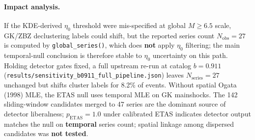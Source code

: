 \documentclass[draft]{agujournal2019}
\begin{document}
\paragraph{Impact analysis.}
If the KDE-derived $\eta_0$ threshold were mis-specified at global $M \ge 6.5$
scale, GK/ZBZ declustering labels could shift, but the reported series count
$N_\mathrm{obs}=27$ is computed by \texttt{global\_series()}, which does
\textbf{not} apply $\eta_0$ filtering; the main temporal-null conclusion is therefore
stable to $\eta_0$ uncertainty on this path.
Holding detector gates fixed, a full upstream re-run at catalog $b=0.911$
(\texttt{results/sensitivity\_b0911\_full\_pipeline.json}) leaves
$N_\mathrm{series}=27$ unchanged but shifts cluster labels for 8.2\% of events.
Without spatial Ogata (1998) MLE, the ETAS null uses temporal MLE on GK
mainshocks.
The 142 sliding-window candidates merged to 47 series are the dominant source
of detector liberalness; $p_\mathrm{ETAS}=1.0$ under calibrated ETAS indicates
detector output matches the null on \textbf{temporal} series count; spatial
linkage among dispersed candidates was \textbf{not tested}.
\end{document}
